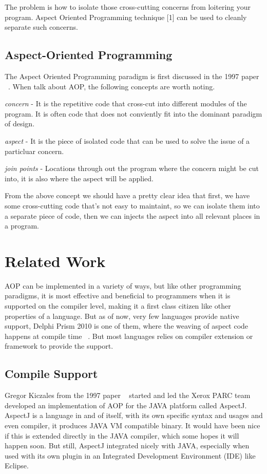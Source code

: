 The problem is how to isolate those cross-cutting concerns from loitering your program. Aspect Oriented Programming technique [1] can be used to cleanly separate such concerns.

\subsection{Aspect-Oriented Programming}
The Aspect Oriented Programming paradigm is first discussed in the 1997 paper ~\cite{aop}. When talk about AOP, the following concepts are worth noting.

{\em concern} - It is the repetitive code that cross-cut into different modules of the program. It is often code that does not conviently fit into the dominant paradigm of design.

{\em aspect} - It is the piece of isolated code that can be used to solve the issue of a particluar concern.

{\em join points} - Locations through out the program where the concern might be cut into, it is also where the aspect will be applied.

From the above concept we should have a pretty clear idea that first, we have some cross-cutting code that's not easy to maintaint, so we can isolate them into a separate piece of code, then we can injects the aspect into all relevant places in a program.

\section{Related Work}AOP can be implemented in a variety of ways, but like other programming paradigms, it is most effective and beneficial to programmers when it is supported on the compiler level, making it a first class citizen like other properties of a language. But as of now, very few languages provide native support, Delphi Prism 2010 is one of them, where the weaving of aspect code happens at compile time ~\cite{delphi_prism2010}. But most languages relies on compiler extension or framework to provide the support.

\subsection{Compile Support}

Gregor Kiczales from the 1997 paper ~\cite{aop} started and led the Xerox PARC team developed an implementation of AOP for the JAVA platform called AspectJ. AspectJ is a language in and of itself, with its own specific syntax and usages and even compiler, it produces JAVA VM compatible binary. It would have been nice if this is extended directly in the JAVA compiler, which some hopes it will happen soon. But still, AspectJ integrated nicely with JAVA, especially when used with its own plugin in an Integrated Development Environment (IDE) like Eclipse.

